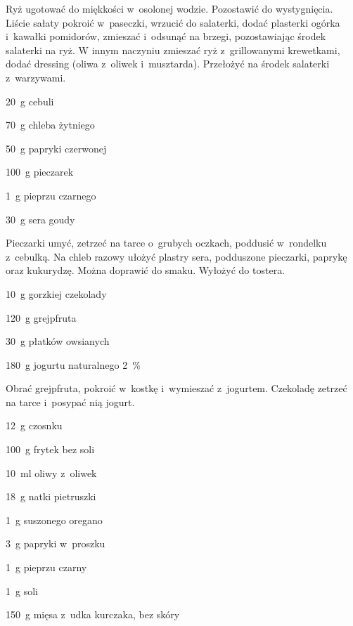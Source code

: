 \documentclass[../main.tex]{subfiles}
\begin{document}
Ryż ugotować do miękkości w~osolonej wodzie. Pozostawić do wystygnięcia. Liście
sałaty pokroić w~paseczki, wrzucić do salaterki, dodać plasterki ogórka
i~kawałki pomidorów, zmieszać i~odsunąć na brzegi, pozostawiając środek
salaterki na ryż. W innym naczyniu zmieszać ryż z~grillowanymi krewetkami,
dodać dressing (oliwa z~oliwek i~musztarda). Przełożyć na środek salaterki
z~warzywami.


\begin{Ingred}
    \item \qty{20}{\gram} cebuli
    \item \qty{70}{\gram} chleba żytniego
    \item \qty{50}{\gram} papryki czerwonej
    \item \qty{100}{\gram} pieczarek
    \item \qty{1}{\gram} pieprzu czarnego
    \item \qty{30}{\gram} sera goudy
\end{Ingred}

Pieczarki umyć, zetrzeć na tarce o~grubych oczkach, poddusić w~rondelku
z~cebulką. Na chleb razowy ułożyć plastry sera, podduszone pieczarki, paprykę
oraz kukurydzę. Można doprawić do smaku. Wyłożyć do tostera.


\begin{Ingred}
    \item \qty{10}{\gram} gorzkiej czekolady
    \item \qty{120}{\gram} grejpfruta
    \item \qty{30}{\gram} płatków owsianych
    \item \qty{180}{\gram} jogurtu naturalnego \qty{2}{\percent}
\end{Ingred}

Obrać grejpfruta, pokroić w~kostkę i~wymieszać z~jogurtem. Czekoladę zetrzeć na
tarce i~posypać nią jogurt.


\begin{Ingred}
    \item \qty{12}{\gram} czosnku
    \item \qty{100}{\gram} frytek bez soli
    \item \qty{10}{\milli\litre} oliwy z~oliwek
    \item \qty{18}{\gram} natki pietruszki
    \item \qty{1}{\gram} suszonego oregano
    \item \qty{3}{\gram} papryki w~proszku
    \item \qty{1}{\gram} pieprzu czarny
    \item \qty{1}{\gram} soli
    \item \qty{150}{\gram} mięsa z~udka kurczaka, bez skóry
\end{Ingred}
\end{document}
